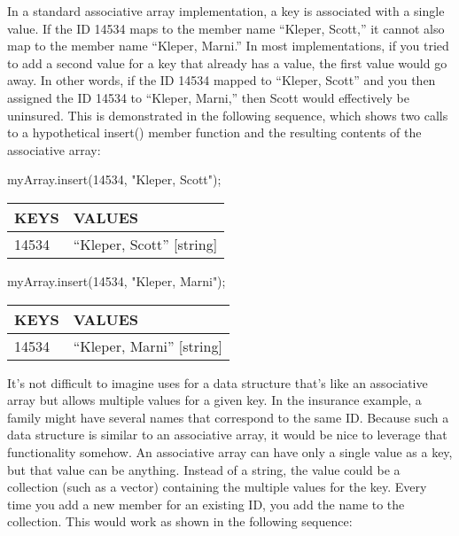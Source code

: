 In a standard associative array implementation, a key is associated with a single value. If the ID 14534 maps to the member name “Kleper, Scott,” it cannot also map to the member name “Kleper, Marni.” In most implementations, if you tried to add a second value for a key that already has a value, the first value would go away. In other words, if the ID 14534 mapped to “Kleper, Scott” and you then assigned the ID 14534 to “Kleper, Marni,” then Scott would effectively be uninsured. This is demonstrated in the following sequence, which shows two calls to a hypothetical insert() member function and the resulting contents of the associative array:

\begin{cpp}
myArray.insert(14534, "Kleper, Scott");
\end{cpp}

\begin{longtable}{|l|l|}
\hline
\textbf{KEYS} & \textbf{VALUES}              \\ \hline
\endfirsthead
%
\endhead
%
14534         & “Kleper, Scott” {[}string{]} \\ \hline
\end{longtable}

\begin{cpp}
myArray.insert(14534, "Kleper, Marni");
\end{cpp}

\begin{longtable}{|l|l|}
\hline
\textbf{KEYS} & \textbf{VALUES}              \\ \hline
\endfirsthead
%
\endhead
%
14534         & “Kleper, Marni” {[}string{]} \\ \hline
\end{longtable}

It’s not difficult to imagine uses for a data structure that’s like an associative array but allows multiple values for a given key. In the insurance example, a family might have several names that correspond to the same ID. Because such a data structure is similar to an associative array, it would be nice to leverage that functionality somehow. An associative array can have only a single value as a key, but that value can be anything. Instead of a string, the value could be a collection (such as a vector) containing the multiple values for the key. Every time you add a new member for an existing ID, you add the name to the collection. This would work as shown in the following sequence:

